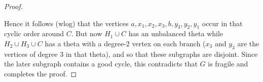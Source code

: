 \documentclass[10pt,a4paper]{amsart}
\begin{document}
\begin{proof}
    \begin{figure}[H]
        \centering
        
        \label{fig:fragile5}
    \end{figure}

    Hence it follows (wlog) that the vertices $a,x_1,x_2,x_3,b,y_3,y_2,y_1$ occur in that cyclic order around $C$. But now $H_1 \cup C$ has an unbalanced theta while $H_2 \cup H_3 \cup C$ has a theta with a degree-2 vertex on each branch ($x_3$ and $y_3$ are the vertices of degree 3 in that theta), and so that these subgraphs are disjoint. Since the later subgraph contains a good cycle, this contradicts that $G$ is fragile and completes the proof.
\end{proof}
\end{document}
